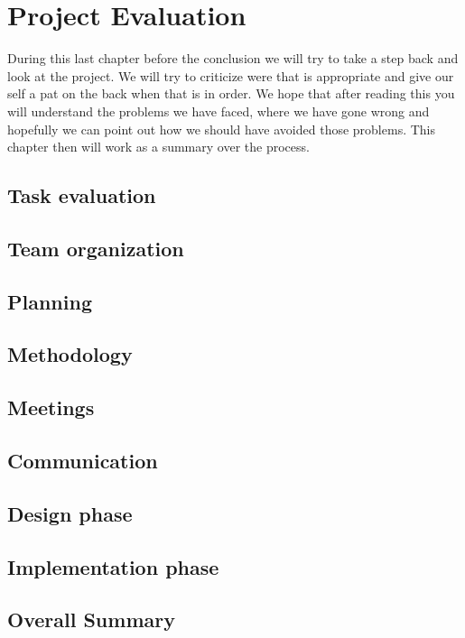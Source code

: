 \section{Project Evaluation}\label{Project Evaluation}
    During this last chapter before the conclusion we will try to take a step back and look at the project. We will try to criticize were that is appropriate and give our self a pat on the back when that is in order. We hope that after reading this you will understand the problems we have faced, where we have gone wrong and hopefully we can point out how we should have avoided those problems. This chapter then will work as a summary over the process.
    
    \subsection{Task evaluation}
        
        
    \subsection{Team organization}
        
        
    \subsection{Planning}
        
        
    \subsection{Methodology}
        
        
    \subsection{Meetings}
        
        
    \subsection{Communication}
        
        
    \subsection{Design phase}
        
        
    \subsection{Implementation phase}
        
        
    \subsection{Overall Summary}    
        




